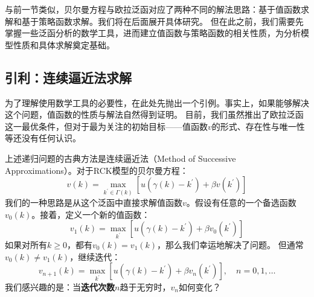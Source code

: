 与前一节类似，贝尔曼方程与欧拉泛函对应了两种不同的解法思路：基于值函数求解和基于策略函数求解。我们将在后面展开具体研究。
但在此之前，我们需要先掌握一些泛函分析的数学工具，进而建立值函数与策略函数的相关性质，为分析模型性质和具体求解奠定基础。


\subsection{引利：连续逼近法求解}

为了理解使用数学工具的必要性，在此处先抛出一个引例。事实上，如果能够解决这个问题，值函数的性质与解法自然得到证明。
目前，我们虽然推出了欧拉泛函这一最优条件，但对于最为关注的初始目标——值函数$v$的形式、存在性与唯一性等还没有任何认识。

上述递归问题的古典方法是连续逼近法（Method of Successive Approximations）。对于RCK模型的贝尔曼方程：
\begin{equation*}
    v\left(k\right)=\max_{k^{\prime}\in\Gamma(k)}
        \left[u\left(\gamma\left(k\right)-k^{\prime}\right)+\beta v\left(k^{\prime}\right)\right]
\end{equation*}
我们的一种思路是从这个泛函中直接求解值函数$v$。假设有任意的一个备选函数$v_0\left(k\right)$。接着，定义一个新的值函数：
\begin{equation*}
    v_1\left(k\right) = \max_{k^{\prime}}
        \left[u\left(\gamma\left(k\right)-k^{\prime}\right)+\beta v_0\left(k^{\prime}\right)\right]
\end{equation*}
如果对所有$k\geq 0$，都有$v_0\left(k\right)=v_1\left(k\right)$，那么我们幸运地解决了问题。
但通常$v_0\left(k\right) \neq v_1\left(k\right)$，继续迭代：
\begin{equation*}
    v_{n+1}\left(k\right) = \max _{k^{\prime}}
        \left[u\left(\gamma\left(k\right)-k^{\prime}\right)+\beta v_n\left(k^{\prime}\right)\right],\quad n = 0,1,\dots
\end{equation*}
我们感兴趣的是：当\textbf{迭代次数}$n$趋于无穷时，$v_n$如何变化？

